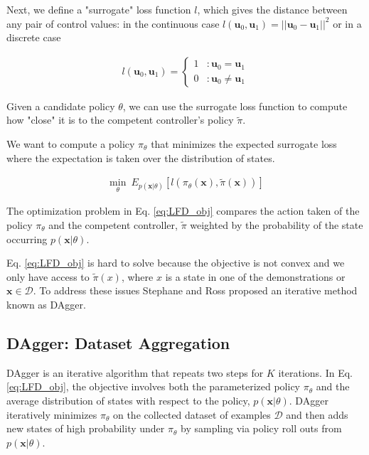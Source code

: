 \documentclass[10pt, conference]{ieeeconf}      %
\newcommand{\bu}{\mathbf{u}}
\newcommand{\bx}{\mathbf{x}}
\begin{document}
Next, we define a "surrogate" loss function $l$, which gives the distance between any pair of control values: in the continuous case $l(\bu_0,\bu_1) = ||\bu_0-\bu_1||^2$ or in a discrete case

 \vspace{-2ex}
\begin{align}
 l(\bu_0,\bu_1) = \left\{
     \begin{array}{lr}
       1 & : \bu_0 = \bu_1\\
       0 & : \bu_0 \neq \bu_1
     \end{array}
   \right.
\end{align}

Given a candidate policy $\theta$, we can use the surrogate loss function to compute how "close" it is to the competent controller's policy $\tilde{\pi}$. 

We want to compute a policy $\pi_{\theta}$ that minimizes the expected surrogate loss where the expectation is taken over the distribution of states. 

 \vspace{-2ex}
\begin{align}\label{eq:LFD_obj}
\underset{\theta}{\min} \: E_{p(\bx|\theta)} [l(\pi_\theta(\bx),\tilde{\pi}(\bx))]
\end{align}
 
 
 
 
The optimization problem in Eq. \ref{eq:LFD_obj} compares the action taken of the policy $\pi_\theta$ and  the competent controller, $\tilde{\pi}$  weighted by the probability of  the state occurring $p(\bx|\theta)$. 

Eq. \ref{eq:LFD_obj} is hard to solve because  the objective is not convex and we only have access to $\tilde{\pi}(x)$, where $x$ is a state in one of the demonstrations or $\bx \in \mathcal{D}$. To address these issues Stephane and Ross proposed an iterative method known as DAgger\cite{ross2010reduction}.






 \subsection{DAgger: Dataset Aggregation}
 DAgger is an iterative algorithm that repeats two steps for $K$ iterations. 
 In Eq. \ref{eq:LFD_obj}, the objective involves both the parameterized policy $\pi_{\theta}$ and the average distribution of states with respect to the policy, $p(\bx|\theta)$. DAgger iteratively minimizes $\pi_{\theta}$ on the collected dataset of examples $\mathcal{D}$ and then adds new states of high probability under $\pi_\theta$ by sampling via policy roll outs from $p(\bx|\theta)$. 
\end{document}
